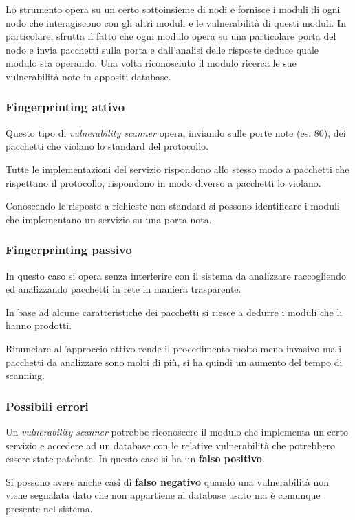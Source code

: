 Lo strumento opera su un certo sottoinsieme di nodi e fornisce i moduli di ogni nodo che interagiscono con gli altri
moduli e le vulnerabilità di questi moduli. In particolare, sfrutta il fatto che ogni modulo opera su una particolare
porta del nodo e invia pacchetti sulla porta e dall'analisi delle risposte deduce quale modulo sta operando. Una volta
riconosciuto il modulo ricerca le sue vulnerabilità note in appositi database.

\subsubsection{Fingerprinting attivo}
Questo tipo di \emph{vulnerability scanner} opera, inviando sulle porte note (es. 80), dei pacchetti che violano lo
standard del protocollo.

Tutte le implementazioni del servizio rispondono allo stesso modo a pacchetti che rispettano il protocollo, rispondono
in modo diverso a pacchetti lo violano.

Conoscendo le risposte a richieste non standard si possono identificare i moduli che implementano un servizio su una
porta nota.

\subsubsection{Fingerprinting passivo}
In questo caso si opera senza interferire con il sistema da analizzare raccogliendo ed analizzando pacchetti in rete
in maniera trasparente.

In base ad alcune caratteristiche dei pacchetti si riesce a dedurre i moduli che li hanno prodotti.

Rinunciare all'approccio attivo rende il procedimento molto meno invasivo ma i pacchetti da analizzare sono molti di
più, si ha quindi un aumento del tempo di scanning.

\subsubsection{Possibili errori}
Un \emph{vulnerability scanner} potrebbe riconoscere il modulo che implementa un certo servizio e accedere ad un
database con le relative vulnerabilità che potrebbero essere state patchate. In questo caso si ha un \textbf{falso
	positivo}.

Si possono avere anche casi di \textbf{falso negativo} quando una vulnerabilità non viene segnalata dato che non
appartiene al database usato ma è comunque presente nel sistema.

